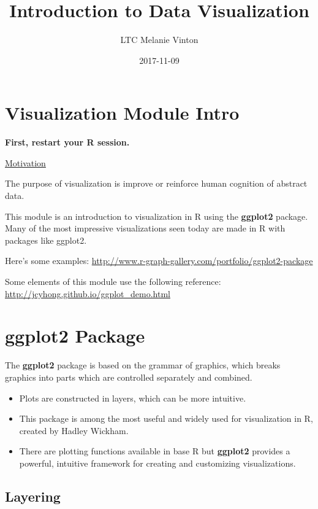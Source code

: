 \documentclass[oneside]{memoir}
\title{Introduction to Data Visualization}
\author{LTC Melanie Vinton}
\date{2017-11-09}
\theoremstyle{definition}
\theoremstyle{definition}
\theoremstyle{definition}
\theoremstyle{remark}
\begin{document}
\maketitle

{
\setcounter{tocdepth}{1}
\tableofcontents
}
\chapter{Visualization Module Intro}\label{visualization-module-intro}

\textbf{First, restart your R session.}

\href{https://www.youtube.com/watch?v=jbkSRLYSojo}{Motivation}

The purpose of visualization is improve or reinforce human cognition of
abstract data.

This module is an introduction to visualization in R using the
\textbf{ggplot2} package. Many of the most impressive visualizations
seen today are made in R with packages like ggplot2.

Here's some examples:
\url{http://www.r-graph-gallery.com/portfolio/ggplot2-package}

Some elements of this module use the following reference:
\url{http://jcyhong.github.io/ggplot_demo.html}

\chapter{ggplot2 Package}\label{ggplot2-package}

The \textbf{ggplot2} package is based on the grammar of graphics, which
breaks graphics into parts which are controlled separately and combined.

\begin{itemize}
\item
  Plots are constructed in layers, which can be more intuitive.
\item
  This package is among the most useful and widely used for
  visualization in R, created by Hadley Wickham.
\item
  There are plotting functions available in base R but \textbf{ggplot2}
  provides a powerful, intuitive framework for creating and customizing
  visualizations.
\end{itemize}

\section{Layering}\label{layering}
\end{document}
